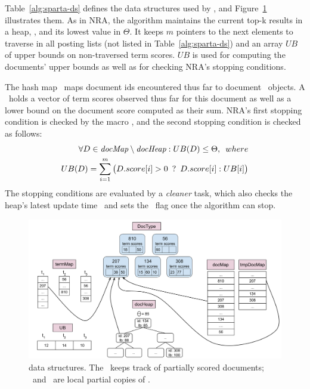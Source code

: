 Table~\ref{alg:sparta-ds} defines the data structures used by \alg,
and Figure~\ref{fig:sparta_ds} illustrates them. 
As in NRA, the algorithm maintains the current top-k results in a heap, \DHeap, and its lowest value in $\Theta$. It keeps $m$ pointers to the next elements to traverse in all posting lists (not listed in Table~\ref{alg:sparta-ds})
and an array $UB$ of upper bounds on non-traversed term scores. 
$UB$ is used for computing the documents' upper bounds 
as well as for checking NRA's  stopping conditions.   

The hash map 
\DMap\ maps  document ids encountered thus far to document \Docobj\ objects. A \Docobj\ holds a vector of term scores observed thus far for this document as well as a lower bound on the document score computed as their sum.
NRA's first stopping condition is checked by the macro \RAStop, and the 
second stopping condition is checked as follows: 
\begin{equation} \label{eq:stop2}
\begin{split}
\forall D\in \textit{docMap} \setminus \textit{docHeap} : UB(D) \le \Theta, \enskip where \\
UB(D) = \sum_{i=1}^m \big(D.score[i] > 0 \enskip ? \enskip D.score[i] : UB[i] \big)
\end{split}
\end{equation}
The stopping conditions are evaluated by a \emph{cleaner} task,
which also checks the heap's latest update time \HeapUpdateTime\ and 
sets the \Done\ flag once the algorithm can stop.

\begin{figure}[tbh]
\centering
\includegraphics[width=.8\linewidth]{figures/localData}
\caption{\alg\/ data structures. The \DMap\ keeps track of partially scored documents; \LDMap\ and \TMap\ are local partial copies of \DMap.}
\label{fig:sparta_ds}
\end{figure}

